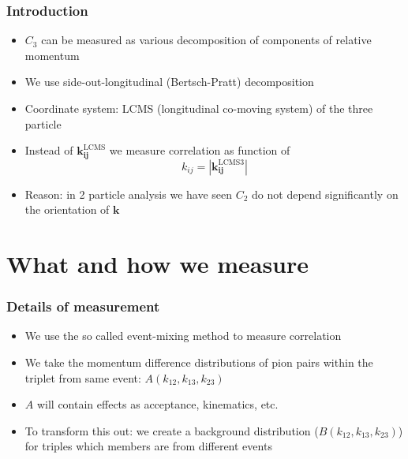 \documentclass{beamer}
\begin{document}
\begin{frame}
\frametitle{Introduction}
\begin{itemize}
\setlength{\itemsep}{12pt}
\item $C_3$ can be measured as various decomposition of components of relative momentum
\item We use side-out-longitudinal (Bertsch-Pratt) decomposition 
\item Coordinate system: LCMS (longitudinal co-moving system) of the three particle
\item Instead of $\bm{k_{ij}^{\mathrm{LCMS}}}$ we measure correlation as function of 
\begin{equation*}
k_{ij}=|\bm{k_{ij}^{\mathrm{LCMS3}}}|
\end{equation*}
\item Reason: in 2 particle analysis we have seen $C_2$ do not depend significantly on the orientation of $\bm{k}$
\end{itemize}
\end{frame}

\section{What and how we measure}
\begin{frame}
\frametitle{Details of measurement}
\begin{itemize}
\setlength{\itemsep}{22pt}
\item We use the so called event-mixing method to measure correlation
\item We take the momentum difference distributions of pion pairs within the triplet from same event: $A(k_{12}, k_{13}, k_{23})$
\item $A$ will contain effects as acceptance, kinematics, etc.
\item To transform this out: we create a background distribution ($B(k_{12}, k_{13}, k_{23})$) for triples which members are from different events
\end{itemize}
\end{frame}
\end{document}
